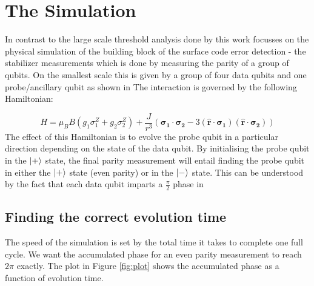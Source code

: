 \section{The Simulation}
In contrast to the large scale threshold analysis done by \citet{OGorman2016} this work focusses on the physical simulation of the building block of the surface code error detection - the stabilizer measurements which is done by measuring the parity of a group of qubits. On the smallest scale this is given by a group of four data qubits and one probe/ancillary qubit as shown in 
The interaction is governed by the following Hamiltonian:

\begin{equation}
H = \mu_B B( g_1 \sigma_1^Z + g_2 \sigma_2^Z) + \frac{J}{r^3} ( \mathbf{\sigma_1} \cdot \mathbf{\sigma_2} - 3 ( \hat{\mathbf{r}} \cdot \mathbf{\sigma_1}) ( \hat{\mathbf{r}}\cdot \mathbf{\sigma_2}))
\end{equation}
The effect of this Hamiltonian is to evolve the probe qubit in a particular direction depending on the state of the data qubit. By initialising the probe qubit in the $\ket{+}$ state, the final parity measurement will entail finding the probe qubit in either the $\ket{+}$ state (even parity) or in the $\ket{-}$ state. This can be understood by the fact that each data qubit imparts a $\frac{\pi}{2}$ phase in 

\subsection{Finding the correct evolution time}
The speed of the simulation is set by the total time it takes to complete one full cycle. We want the accumulated phase for an even parity measurement to reach $2\pi$ exactly. The plot in Figure \ref{fig:plot} shows the accumulated phase as a function of evolution time. 



